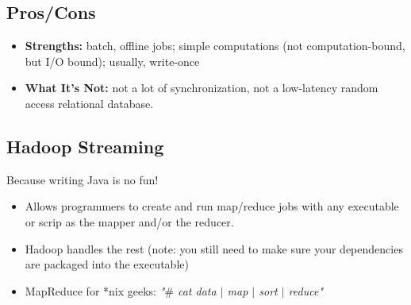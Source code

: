 \subsection{Pros/Cons}
\begin{itemize}
\item \textbf{Strengths:} batch, offline jobs; simple computations (not computation-bound, but I/O bound); usually, write-once
\item \textbf{What It's Not:} not a lot of synchronization, not a low-latency random access relational database.
\end{itemize}
\subsection{Hadoop Streaming}
Because writing Java is no fun!
\begin{itemize}
\item Allows programmers to create and run map/reduce jobs with any executable or scrip as the mapper and/or the reducer. 
\item Hadoop handles the rest (note: you still need to make sure your dependencies are packaged into the executable)
\item MapReduce for *nix geeks: \textit{"$\#$ cat data $|$ map $|$ sort $|$ reduce"}
\end{itemize}